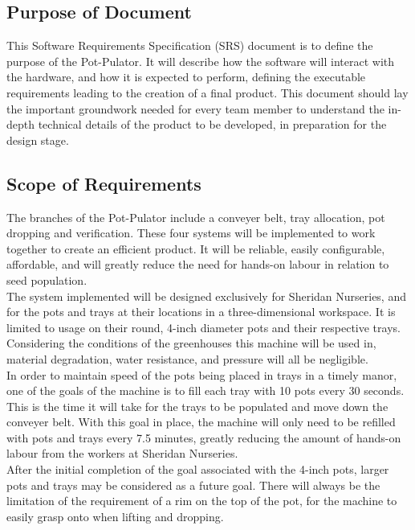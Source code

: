 \documentclass[12pt]{article}
\begin{document}
\subsection{Purpose of Document}

This Software Requirements Specification (SRS) document is to define the purpose of the Pot-Pulator. It will describe how the software will interact with the hardware, and how it is expected to perform, defining the executable requirements leading to the creation of a final product. This document should lay the important groundwork needed for every team member to understand the in-depth technical details of the product to be developed, in preparation for the design stage. 

\subsection{Scope of Requirements} 

The branches of the Pot-Pulator include a conveyer belt, tray allocation, pot dropping and verification. These four systems will be implemented to work together to create an efficient product. It will be reliable, easily configurable, affordable, and will greatly reduce the need for hands-on labour in relation to seed population.  \\

\noindent The system implemented will be designed exclusively for Sheridan Nurseries, and for the pots and trays at their locations in a three-dimensional workspace. It is limited to usage on their round, 4-inch diameter pots and their respective trays. Considering the conditions of the greenhouses this machine will be used in, material degradation, water resistance, and pressure will all be negligible. \\

\noindent In order to maintain speed of the pots being placed in trays in a timely manor, one of the goals of the machine is to fill each tray with 10 pots every 30 seconds. This is the time it will take for the trays to be populated and move down the conveyer belt. With this goal in place, the machine will only need to be refilled with pots and trays every 7.5 minutes, greatly reducing the amount of hands-on labour from the workers at Sheridan Nurseries. \\

\noindent After the initial completion of the goal associated with the 4-inch pots, larger pots and trays may be considered as a future goal. There will always be the limitation of the requirement of a rim on the top of the pot, for the machine to easily grasp onto when lifting and dropping. \\
\end{document}
